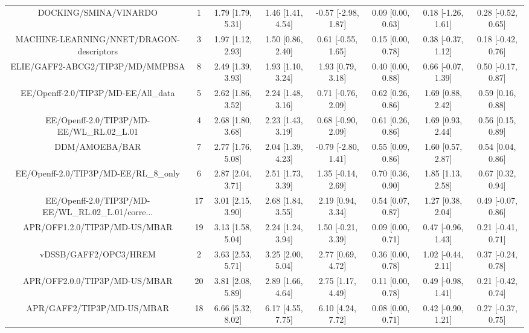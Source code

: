 \documentclass[8pt]{article}
\begin{document}
\begin{center}
\begin{footnotesize}
\begin{longtable}{|cccccccc|}
\bottomrule
\endlastfoot
                             DOCKING/SMINA/VINARDO &   1 & 1.79 [1.79, 5.31] & 1.46 [1.41, 4.54] & -0.57 [-2.98, 1.87] & 0.09 [0.00, 0.63] & 0.18 [-1.26, 1.61] & 0.28 [-0.52, 0.65] \\
          MACHINE-LEARNING/NNET/DRAGON-descriptors &   3 & 1.97 [1.12, 2.93] & 1.50 [0.86, 2.40] &  0.61 [-0.55, 1.65] & 0.15 [0.00, 0.78] & 0.38 [-0.37, 1.12] & 0.18 [-0.42, 0.76] \\
                  ELIE/GAFF2-ABCG2/TIP3P/MD/MMPBSA &   8 & 2.49 [1.39, 3.93] & 1.93 [1.10, 3.24] &   1.93 [0.79, 3.18] & 0.40 [0.00, 0.88] & 0.66 [-0.07, 1.39] & 0.50 [-0.17, 0.87] \\
               EE/Openff-2.0/TIP3P/MD-EE/All\_data &   5 & 2.62 [1.86, 3.52] & 2.24 [1.48, 3.16] &  0.71 [-0.76, 2.09] & 0.62 [0.26, 0.86] &  1.69 [0.88, 2.42] &  0.59 [0.16, 0.88] \\
         EE/Openff-2.0/TIP3P/MD-EE/WL\_RL.02\_L.01 &   4 & 2.68 [1.80, 3.68] & 2.23 [1.43, 3.19] &  0.68 [-0.90, 2.09] & 0.61 [0.26, 0.86] &  1.69 [0.93, 2.44] &  0.56 [0.15, 0.89] \\
                                    DDM/AMOEBA/BAR &   7 & 2.77 [1.76, 5.08] & 2.04 [1.39, 4.23] & -0.79 [-2.80, 1.41] & 0.55 [0.09, 0.86] &  1.60 [0.57, 2.87] &  0.54 [0.04, 0.86] \\
             EE/Openff-2.0/TIP3P/MD-EE/RL\_8\_only &   6 & 2.87 [2.04, 3.71] & 2.51 [1.73, 3.39] &  1.35 [-0.14, 2.69] & 0.70 [0.36, 0.90] &  1.85 [1.13, 2.58] &  0.67 [0.32, 0.94] \\
EE/Openff-2.0/TIP3P/MD-EE/WL\_RL.02\_L.01/corre... &  17 & 3.01 [2.15, 3.90] & 2.68 [1.84, 3.55] &   2.19 [0.94, 3.34] & 0.54 [0.07, 0.87] &  1.27 [0.38, 2.04] & 0.49 [-0.07, 0.86] \\
                     APR/OFF1.2.0/TIP3P/MD-US/MBAR &  19 & 3.13 [1.58, 5.04] & 2.24 [1.24, 3.94] &  1.50 [-0.21, 3.39] & 0.09 [0.00, 0.71] & 0.47 [-0.96, 1.43] & 0.21 [-0.41, 0.71] \\
                             vDSSB/GAFF2/OPC3/HREM &   2 & 3.63 [2.53, 5.71] & 3.25 [2.00, 5.04] &   2.77 [0.69, 4.72] & 0.36 [0.00, 0.78] & 1.02 [-0.44, 2.11] & 0.37 [-0.24, 0.78] \\
                     APR/OFF2.0.0/TIP3P/MD-US/MBAR &  20 & 3.81 [2.08, 5.89] & 2.89 [1.66, 4.64] &   2.75 [1.17, 4.49] & 0.11 [0.00, 0.78] & 0.49 [-0.98, 1.41] & 0.21 [-0.42, 0.74] \\
                        APR/GAFF2/TIP3P/MD-US/MBAR &  18 & 6.66 [5.32, 8.02] & 6.17 [4.55, 7.75] &   6.10 [4.24, 7.72] & 0.08 [0.00, 0.71] & 0.42 [-0.90, 1.21] & 0.27 [-0.37, 0.75] \\
\end{longtable}
\end{footnotesize}
\end{center}
\end{document}
